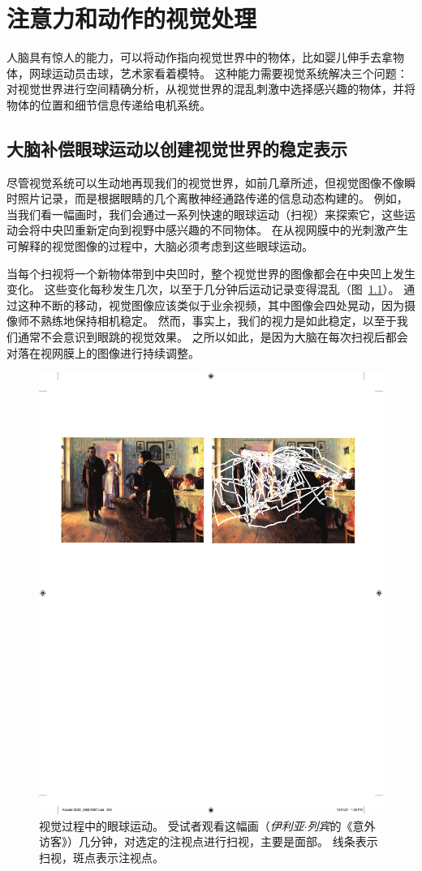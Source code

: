 \chapter{注意力和动作的视觉处理} \label{chap:chap25}

人脑具有惊人的能力，可以将动作指向视觉世界中的物体，比如婴儿伸手去拿物体，网球运动员击球，艺术家看着模特。
这种能力需要视觉系统解决三个问题：
对视觉世界进行空间精确分析，从视觉世界的混乱刺激中选择感兴趣的物体，并将物体的位置和细节信息传递给电机系统。



\section{大脑补偿眼球运动以创建视觉世界的稳定表示}

尽管视觉系统可以生动地再现我们的视觉世界，如前几章所述，但视觉图像不像瞬时照片记录，而是根据眼睛的几个离散神经通路传递的信息动态构建的。
例如，当我们看一幅画时，我们会通过一系列快速的眼球运动（扫视）来探索它，这些运动会将中央凹重新定向到视野中感兴趣的不同物体。
在从视网膜中的光刺激产生可解释的视觉图像的过程中，大脑必须考虑到这些眼球运动。


当每个扫视将一个新物体带到中央凹时，整个视觉世界的图像都会在中央凹上发生变化。
这些变化每秒发生几次，以至于几分钟后运动记录变得混乱（图~\ref{fig:25_1}）。
通过这种不断的移动，视觉图像应该类似于业余视频，其中图像会四处晃动，因为摄像师不熟练地保持相机稳定。 
然而，事实上，我们的视力是如此稳定，以至于我们通常不会意识到眼跳的视觉效果。
之所以如此，是因为大脑在每次扫视后都会对落在视网膜上的图像进行持续调整。


\begin{figure}[htbp]
	\centering
	\includegraphics[width=0.65\linewidth]{chap25/fig_25_1}
	\caption{视觉过程中的眼球运动。
		受试者观看这幅画（\textit{伊利亚$\cdot$列宾}的《意外访客》）几分钟，对选定的注视点进行扫视，主要是面部。
		线条表示扫视，斑点表示注视点。}
	\label{fig:25_1}
\end{figure}


